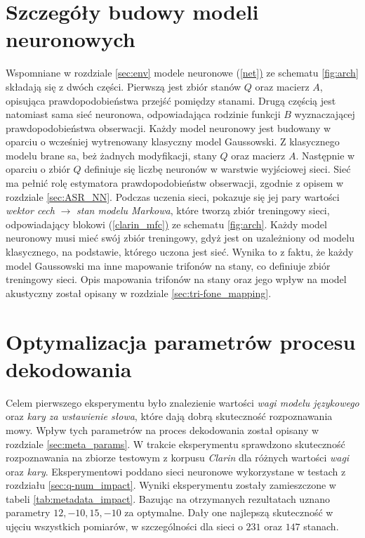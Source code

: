 \documentclass[shortabstract, mgr]{iithesis}
\newcommand{\refBlock}[1]{(\hyperref[#1]{\ref*{#1})}
}
\begin{document}
	\section{ Szczegóły budowy modeli neuronowych}
		\label{sec:nn_model_details}
		Wspomniane w rozdziale \ref{sec:env} modele neuronowe \refBlock{net} ze schematu \ref{fig:arch} składają się z dwóch części. Pierwszą jest zbiór stanów $Q$ oraz macierz $A$, opisująca prawdopodobieństwa przejść pomiędzy stanami. Drugą częścią jest natomiast sama sieć neuronowa, odpowiadająca rodzinie funkcji $B$ wyznaczającej prawdopodobieństwa obserwacji. Każdy model neuronowy jest budowany w oparciu o wcześniej wytrenowany klasyczny model Gaussowski. Z klasycznego modelu brane sa, beż żadnych modyfikacji, stany $Q$ oraz macierz $A$. Następnie w oparciu o zbiór $Q$ definiuje się liczbę neuronów w warstwie wyjściowej sieci. Sieć ma pełnić rolę estymatora prawdopodobieństw obserwacji, zgodnie z opisem w rozdziale \ref{sec:ASR_NN}. Podczas uczenia sieci, pokazuje się jej pary wartości \textit{wektor cech} $\longrightarrow$ \textit{stan modelu Markowa}, które tworzą zbiór treningowy sieci, odpowiadający blokowi \refBlock{clarin_mfc} ze schematu \ref{fig:arch}. Każdy model neuronowy musi mieć swój zbiór treningowy, gdyż jest on uzależniony od modelu klasycznego, na podstawie, którego uczona jest sieć. Wynika to z faktu, że każdy model Gaussowski ma inne mapowanie trifonów na stany, co definiuje zbiór treningowy sieci. Opis mapowania trifonów na stany oraz jego wpływ na model akustyczny został opisany w rozdziale \ref{sec:tri-fone_mapping}.
	
	\section{ Optymalizacja parametrów procesu dekodowania }
		\label{sec:metadata_impact}
		Celem pierwszego eksperymentu było znalezienie wartości \textit{wagi modelu językowego} oraz \textit{kary za wstawienie słowa}, które dają dobrą skuteczność rozpoznawania mowy. Wpływ tych parametrów na proces dekodowania został opisany w rozdziale \ref{sec:meta_params}. W trakcie eksperymentu sprawdzono skuteczność rozpoznawania na zbiorze testowym z korpusu \textit{Clarin} dla różnych wartości \textit{wagi} oraz \textit{kary}. Eksperymentowi poddano sieci neuronowe wykorzystane w testach z rozdziału \ref{sec:q-num_impact}. Wyniki eksperymentu zostały zamieszczone w tabeli \ref{tab:metadata_impact}. Bazując na otrzymanych rezultatach uznano parametry $12, -10, 15, -10$ za optymalne. Dały one najlepszą skuteczność w ujęciu wszystkich pomiarów, w szczególności dla sieci o $231$ oraz $147$ stanach.
		
\end{document}
